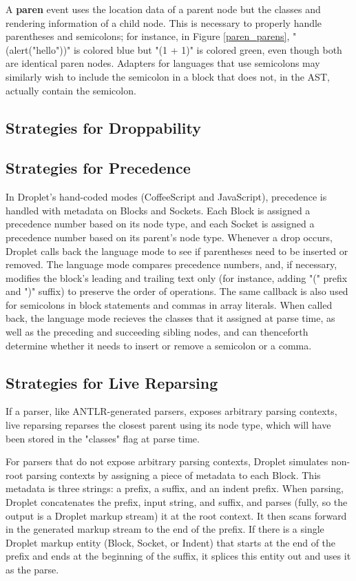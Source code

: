 \documentclass[conference]{IEEEtran}
\begin{document}
A \textbf{paren} event uses the location data of a parent node but the classes and rendering information of a child node. This is necessary to properly handle parentheses and semicolons; for instance, in Figure \ref{paren_parens}, "(alert("hello"))" is colored blue but "(1 + 1)" is colored green, even though both are identical paren nodes. Adapters for languages that use semicolons may similarly wish to include the semicolon in a block that does not, in the AST, actually contain the semicolon.

\subsection{Strategies for Droppability}

\subsection{Strategies for Precedence}
In Droplet's hand-coded modes (CoffeeScript and JavaScript), precedence is handled with metadata on Blocks and Sockets. Each Block is assigned a precedence number based on its node type, and each Socket is assigned a precedence number based on its parent's node type. Whenever a drop occurs, Droplet calls back the language mode to see if parentheses need to be inserted or removed. The language mode compares precedence numbers, and, if necessary, modifies the block's leading and trailing text only (for instance, adding "(" prefix and ")" suffix) to preserve the order of operations. The same callback is also used for semicolons in block statements and commas in array literals. When called back, the language mode recieves the classes that it assigned at parse time, as well as the preceding and succeeding sibling nodes, and can thenceforth determine whether it needs to insert or remove a semicolon or a comma.

\subsection{Strategies for Live Reparsing}
If a parser, like ANTLR-generated parsers, exposes arbitrary parsing contexts, live reparsing reparses the closest parent using its node type, which will have been stored in the "classes" flag at parse time.

For parsers that do not expose arbitrary parsing contexts, Droplet simulates non-root parsing contexts by assigning a piece of metadata to each Block. This metadata is three strings: a prefix, a suffix, and an indent prefix. When parsing, Droplet concatenates the prefix, input string, and suffix, and parses (fully, so the output is a Droplet markup stream) it at the root context. It then scans forward in the generated markup stream to the end of the prefix. If there is a single Droplet markup entity (Block, Socket, or Indent) that starts at the end of the prefix and ends at the beginning of the suffix, it splices this entity out and uses it as the parse.
\end{document}

